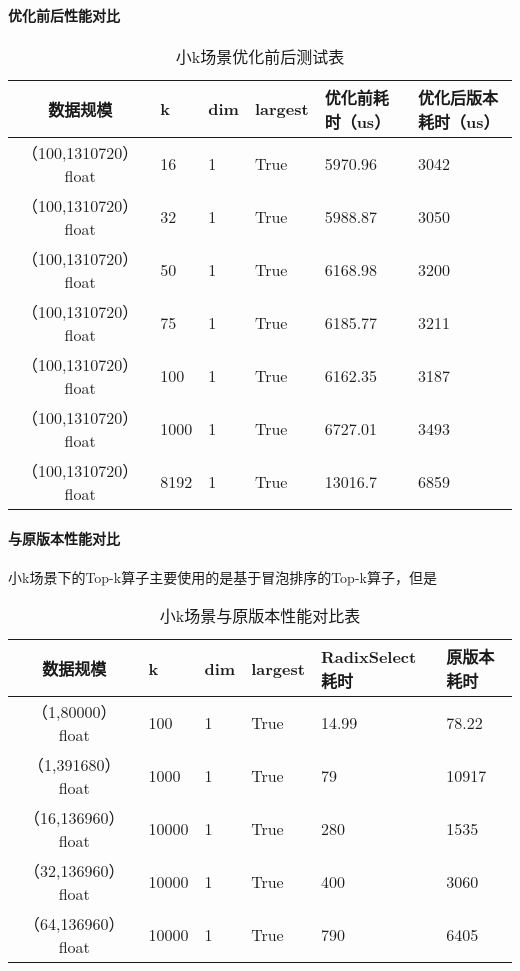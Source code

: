 \paragraph{优化前后性能对比}
\begin{table}
    \centering
    \caption{小k场景优化前后测试表}
    \label{tab:bench_littlek_upgrade}
    \begin{tabular}{clllll}
        \toprule
        数据规模       &k  & dim  & largest & 优化前耗时（us）    & 优化后版本耗时（us） \\
        \midrule
        （100,1310720） float&16&  1     & True      & 5970.96 & 3042 \\
        （100,1310720） float&32&  1     & True      & 5988.87 & 3050 \\
        （100,1310720） float&50&  1     & True      & 6168.98 & 3200 \\
        （100,1310720） float&75&  1     & True      & 6185.77 & 3211 \\
        （100,1310720） float&100&  1     & True      & 6162.35& 3187 \\
        （100,1310720） float&1000&  1     & True      & 6727.01 & 3493 \\
        （100,1310720） float&8192&  1     & True      & 13016.7 & 6859 \\
        
        \bottomrule
    \end{tabular}
    \end{table}



\paragraph{与原版本性能对比}
小k场景下的Top-k算子主要使用的是基于冒泡排序的Top-k算子，但是
\begin{table}
    \centering
    \caption{小k场景与原版本性能对比表}
    \label{tab:bench_littlek}
    \begin{tabular}{clllll}
        \toprule
        数据规模       &k  & dim  & largest & RadixSelect耗时    & 原版本耗时 \\
        \midrule
        （1,80000） float&100&  1     & True      & 14.99 & 78.22 \\
        （1,391680） float&1000&  1     & True      & 79 & 10917  \\

        （16,136960） float&10000&  1     & True      & 280 & 1535 \\
        （32,136960） float&10000&  1     & True      & 400 & 3060 \\
        （64,136960） float&10000&  1     & True      & 790 & 6405 \\
        
        \bottomrule
    \end{tabular}
    \end{table}



